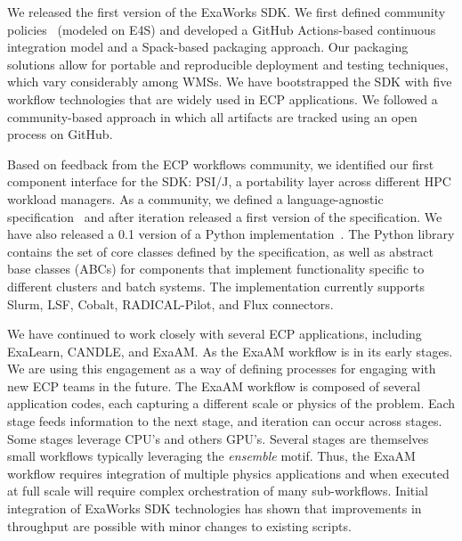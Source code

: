 We released the first version of the ExaWorks SDK. We first defined
community policies~\cite{sdk-policies} (modeled on E4S) and
developed a GitHub Actions-based continuous integration model and 
a Spack-based packaging approach. 
Our packaging solutions allow for portable and reproducible deployment and 
testing techniques, which vary considerably among WMSs.
We have bootstrapped the SDK with five workflow technologies 
that are widely used in ECP applications. We followed a community-based
approach in which all artifacts are tracked using an open process on GitHub. 

Based on feedback from the ECP workflows community, we identified our 
first component interface for the SDK: PSI/J, a portability layer across different HPC workload managers. 
As a community, we defined a language-agnostic specification~\cite{jpsi-spec}
and after iteration released a first version of the specification. 
We have also released a 0.1 version of a Python implementation~\cite{jpsi-python}. 
The Python library contains the set of
core classes defined by the specification, as well as abstract base classes (ABCs) for components 
that implement functionality specific to different clusters and batch systems.
The implementation currently supports Slurm, LSF, Cobalt, RADICAL-Pilot, and Flux connectors. 

We have continued to work closely with several ECP applications, including 
ExaLearn, CANDLE, and ExaAM.
As the ExaAM workflow is in its early stages. We are using this engagement
as a way of defining processes for engaging with new ECP teams in the future.  
The ExaAM workflow is composed of several application codes, each capturing a
different scale or physics of the problem.  Each stage feeds
information to the next stage, and iteration can occur across stages.  Some
stages leverage CPU's and others GPU's. Several stages are themselves small
workflows typically leveraging the \textit{ensemble} motif. Thus, the ExaAM
workflow requires integration of multiple physics applications and when
executed at full scale will require complex orchestration of many
sub-workflows.  
Initial integration of ExaWorks SDK technologies has shown that
improvements in throughput are possible with minor changes to existing scripts.

